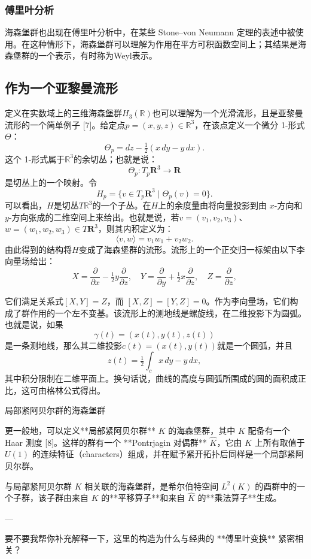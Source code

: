 \subsubsection{傅里叶分析}
海森堡群也出现在傅里叶分析中，在某些 Stone–von Neumann 定理的表述中被使用。在这种情形下，海森堡群可以理解为作用在平方可积函数空间上；其结果是海森堡群的一个表示，有时称为Weyl表示。
\subsection{作为一个亚黎曼流形}
定义在实数域上的三维海森堡群$H_{3}(\mathbb{R})$也可以理解为一个光滑流形，且是亚黎曼流形的一个简单例子 [7]。给定点$p = (x, y, z) \in \mathbb{R}^{3}$，在该点定义一个微分 1-形式 $\Theta$：
$$
\Theta_{p} = dz - \tfrac{1}{2}(x \, dy - y \, dx).~
$$
这个 1-形式属于$\mathbb{R}^{3}$的余切丛；也就是说：
$$
\Theta_{p} : T_{p}\mathbf{R}^{3} \to \mathbf{R}~
$$
是切丛上的一个映射。令
$$
H_{p} = \{ v \in T_{p}\mathbf{R}^{3} \mid \Theta_{p}(v) = 0 \}.~
$$
可以看出，$H$是切丛$T\mathbb{R}^{3}$的一个子丛。在$H$上的余度量由将向量投影到由 $x$-方向和 $y$-方向张成的二维空间上来给出。也就是说，若$v = (v_{1}, v_{2}, v_{3})$、$w = (w_{1}, w_{2}, w_{3}) \in T\mathbf{R}^{3}$，则其内积定义为：
$$
\langle v, w \rangle = v_{1} w_{1} + v_{2} w_{2}.~
$$
由此得到的结构将$H$变成了海森堡群的流形。流形上的一个正交归一标架由以下李向量场给出：
$$
X = \frac{\partial}{\partial x} - \tfrac{1}{2}y \frac{\partial}{\partial z}, \quad
Y = \frac{\partial}{\partial y} + \tfrac{1}{2}x \frac{\partial}{\partial z}, \quad
Z = \frac{\partial}{\partial z},~
$$

它们满足关系式$[X, Y] = Z$，而 $[X, Z] = [Y, Z] = 0$。作为李向量场，它们构成了群作用的一个左不变基。该流形上的测地线是螺旋线，在二维投影下为圆弧。也就是说，如果
$$
\gamma(t) = (x(t), y(t), z(t))~
$$
是一条测地线，那么其二维投影$c(t) = (x(t), y(t))$就是一个圆弧，并且
$$
z(t) = \tfrac{1}{2} \int_{c} x \, dy - y \, dx,~
$$
其中积分限制在二维平面上。换句话说，曲线的高度与圆弧所围成的圆的面积成正比，这可由格林公式得出。

局部紧阿贝尔群的海森堡群

更一般地，可以定义**局部紧阿贝尔群** $K$ 的海森堡群，其中 $K$ 配备有一个 Haar 测度 [8]。这样的群有一个 **Pontrjagin 对偶群** $\hat{K}$，它由 $K$ 上所有取值于 $U(1)$ 的连续特征（characters）组成，并在赋予紧开拓扑后同样是一个局部紧阿贝尔群。

与局部紧阿贝尔群 $K$ 相关联的海森堡群，是希尔伯特空间 $L^{2}(K)$ 的酉群中的一个子群，该子群由来自 $K$ 的**平移算子**和来自 $\hat{K}$ 的**乘法算子**生成。

---

要不要我帮你补充解释一下，这里的构造为什么与经典的 **傅里叶变换** 紧密相关？
